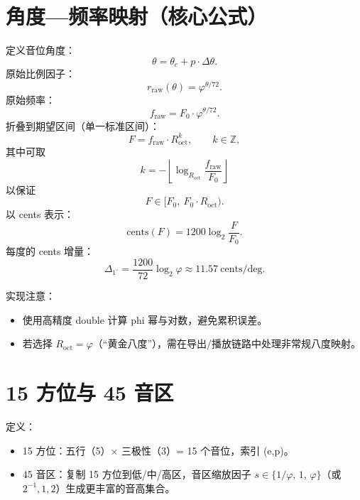 \documentclass{article}
\begin{document}
\section{角度—频率映射（核心公式）}
定义音位角度：
\[
\theta = \theta_e + p\cdot\Delta\theta .
\]
原始比例因子：
\[
r_{\mathrm{raw}}(\theta)=\varphi^{\theta/72}.
\]
原始频率：
\[
f_{\mathrm{raw}} = F_{0}\cdot \varphi^{\theta/72}.
\]
折叠到期望区间（单一标准区间）：
\[
F = f_{\mathrm{raw}}\cdot R_{\mathrm{oct}}^{k},\qquad k\in\mathbb{Z},
\]
其中可取
\[
k = -\left\lfloor \log_{R_{\mathrm{oct}}}\dfrac{f_{\mathrm{raw}}}{F_{0}} \right\rfloor
\]
以保证
\[
F\in [F_{0},\ F_{0}\cdot R_{\mathrm{oct}}).
\]
以 cents 表示：
\[
\mathrm{cents}(F) = 1200\log_2\frac{F}{F_0}.
\]
每度的 cents 增量：
\[
\Delta_{1^\circ} = \frac{1200}{72}\log_2\varphi \approx 11.57\ \text{cents/deg}.
\]

实现注意：
\begin{itemize}
  \item 使用高精度 double 计算 phi 幂与对数，避免累积误差。
  \item 若选择 $R_{\mathrm{oct}}=\varphi$（“黄金八度”），需在导出/播放链路中处理非常规八度映射。
\end{itemize}

\section{15 方位与 45 音区}
定义：
\begin{itemize}
  \item 15 方位：五行（5）× 三极性（3）= 15 个音位，索引 (e,p)。
  \item 45 音区：复制 15 方位到低/中/高区，音区缩放因子 $s\in\{1/\varphi,\,1,\,\varphi\}$（或 $2^{-1},1,2$）生成更丰富的音高集合。
\end{itemize}
\end{document}
